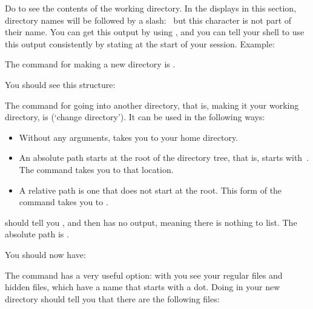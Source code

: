 Do  to see the contents of the working directory. In the
displays in this section, directory names will be followed by a
slash:~ but this character is not part of their name.  You can
get this output by using , and you can tell your shell to
use this output consistently by stating  at the start of your
session. Example:


The command for making a new directory is .

{You should see this structure:
}{}

The command for going into another directory, that is, making it your
working directory, is  (`change directory'). It can be used in
the following ways:
\begin{itemize}
\item {} Without any arguments,  takes you to your home directory.
\item {} An absolute path starts at the root of
  the directory tree, that is, starts with~\n{/}. The  command
  takes you to that location.
\item {} A relative path is one that does not
  start at the root. This form of the  command takes you to
  .
\end{itemize}

{ should tell you , and  then has no
  output, meaning there is nothing to list. 
  The absolute path is .}{}

{You should now have:
}{}

The  command has a very useful option: with  you see
your regular files and hidden files, which have a name that starts
with a dot. Doing  in your new directory should tell you that
there are the following files:

